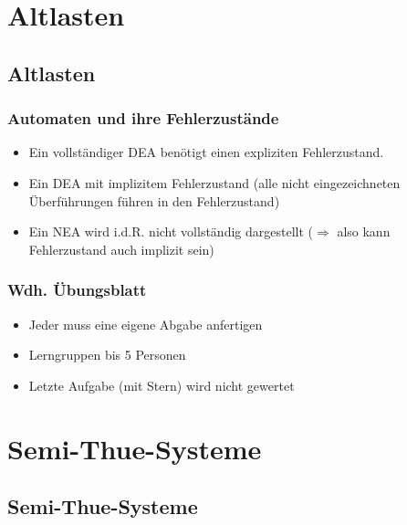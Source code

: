 


\section{Altlasten}
\subsection{Altlasten}

\begin{frame}
\frametitle{Automaten und ihre Fehlerzustände}
\begin{itemize}
	\item Ein vollständiger DEA benötigt einen expliziten Fehlerzustand.
	\item Ein DEA mit implizitem Fehlerzustand (alle nicht eingezeichneten Überführungen führen in den Fehlerzustand)
	\item Ein NEA wird i.d.R. nicht vollständig dargestellt ($\Rightarrow$ also kann Fehlerzustand auch implizit sein)
\end{itemize}
\end{frame}

\begin{frame}
\frametitle{Wdh. Übungsblatt}
\begin{itemize}
	\item Jeder muss eine eigene Abgabe anfertigen
	\item Lerngruppen bis 5 Personen
	\item Letzte Aufgabe (mit Stern) wird nicht gewertet
\end{itemize}
\end{frame}

\section{Semi-Thue-Systeme}
\subsection{Semi-Thue-Systeme}

